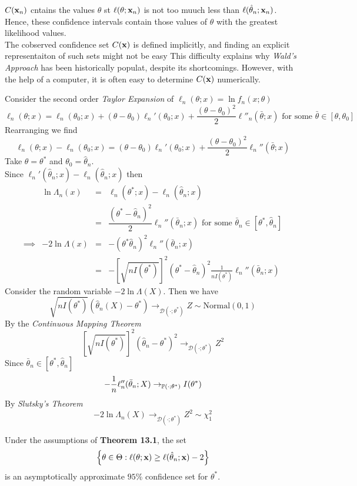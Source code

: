 \documentclass[11pt,a4paper]{article}
\begin{document}
$C(\textbf{x}_n)$ cntains the values $\theta$ st $\ell(\theta;\textbf{x}_n)$ is not too muuch less than $\ell(\hat\theta_n;\textbf{x}_n)$. Hence, these confidence intervals contain those values of $\theta$ with the greatest likelihood values.\\

\remark{}
The cobserved confidence set $C(\textbf{x})$ is defined implicitly, and finding an explicit representaiton of such sets might not be easy This difficulty explains why \textit{Wald's Approach} has been historically populat, despite its shortcomings. However, with the help of a computer, it is often easy to determine $C(\textbf{x})$ numerically.

Consider the second order \textit{Taylor Expansion} of $\ell_n(\theta;x)=\ln f_n(x;\theta)$
$$\ell_n(\theta;x)=\ell_n(\theta_0;x)+(\theta-\theta_0)\ell_n'(\theta_0;x)+\frac{(\theta-\theta_0)^2}{2}\ell''_n(\bar\theta;x)\text{ for some }\bar\theta\in[\theta,\theta_0]$$
Rearranging we find
$$\ell_n(\theta;x)-\ell_n(\theta_0;x)=(\theta-\theta_0)\ell_n'(\theta_0;x)+\frac{(\theta-\theta_0)^2}{2}\ell_n''(\bar\theta;x)$$
Take $\theta=\theta^*$ and $\theta_0=\hat\theta_n$.\\
Since $\ell_n'(\hat\theta_n;x)-\ell_n(\hat\theta_n;x)$ then
\[\begin{array}{rrcl}
&\ln\Lambda_n(x)&=&\ell_n(\theta^*;x)-\ell_n(\hat\theta_n;x)\\
&&=&\dfrac{(\theta^*-\hat\theta_n)^2}{2}\ell_n''(\bar\theta_n;x)\text{ for some }\bar\theta_n\in[\theta^*,\hat\theta_n]\\
\implies&-2\ln\Lambda(x)&=&-(\theta^*\hat\theta_n)^2\ell_n''(\bar\theta_n;x)\\
&&=&-\left[\sqrt{nI(\theta^*)}\right]^2(\theta^*-\hat\theta_n)^2\frac{1}{nI(\theta^*)}\ell_n''(\bar\theta_n;x)
\end{array}\]
Consider the random variable $-2\ln\Lambda(X)$. Then we have
$$\sqrt{nI(\theta^*)}(\hat\theta_n(X)-\theta^*)\to_{\mathcal{D}(\cdot;\theta^*)}Z\sim\text{Normal}(0,1)$$
By the \textit{Continuous Mapping Theorem}
$$\left[\sqrt{nI(\theta^*)}\right]^2(\hat\theta_n-\theta^*)^2\to_{\mathcal{D}(\cdot;\theta^*)}Z^2$$
Since $\bar\theta_n\in[\theta^*,\hat\theta_n]$
$$-\frac{1}{n}\ell_n''(\bar\theta_n;X)\to_{\mathbb{P}(\cdot;\theta^*)}I(\theta^*)$$
By \textit{Slutsky's Theorem}
$$-2\ln\Lambda_n(X)\to_{\mathcal{D}(\cdot;\theta^*)}Z^2\sim\chi^2_1$$
\proved

Under the assumptions of \textbf{Theorem 13.1}, the set
$$\left\{\theta\in\Theta:\ell(\theta;\textbf{x})\geq\ell(\hat\theta_n;\textbf{x})-2\right\}$$
is an asymptotically approximate $95\%$ confidence set for $\theta^*$.\\
\end{document}
